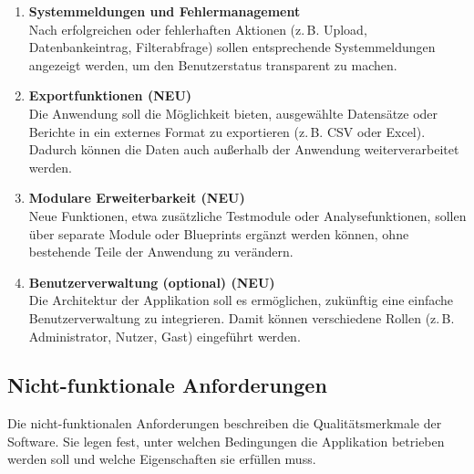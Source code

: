 \begin{enumerate}
  \item \textbf{Systemmeldungen und Fehlermanagement} \\
  Nach erfolgreichen oder fehlerhaften Aktionen (z.\,B. Upload, Datenbankeintrag, Filterabfrage) sollen entsprechende Systemmeldungen angezeigt werden, um den Benutzerstatus transparent zu machen.

  \item \textbf{Exportfunktionen \textbf{(NEU)}} \\
  Die Anwendung soll die Möglichkeit bieten, ausgewählte Datensätze oder Berichte in ein externes Format zu exportieren (z.\,B. CSV oder Excel).
  Dadurch können die Daten auch außerhalb der Anwendung weiterverarbeitet werden.

  \item \textbf{Modulare Erweiterbarkeit \textbf{(NEU)}} \\
  Neue Funktionen, etwa zusätzliche Testmodule oder Analysefunktionen, sollen über separate Module oder Blueprints ergänzt werden können, ohne bestehende Teile der Anwendung zu verändern.

  \item \textbf{Benutzerverwaltung (optional) \textbf{(NEU)}} \\
  Die Architektur der Applikation soll es ermöglichen, zukünftig eine einfache Benutzerverwaltung zu integrieren.
  Damit können verschiedene Rollen (z.\,B. Administrator, Nutzer, Gast) eingeführt werden.
\end{enumerate}

\subsection{Nicht-funktionale Anforderungen}
\label{subsec:nicht-funktionale-anforderungen}

Die nicht-funktionalen Anforderungen beschreiben die Qualitätsmerkmale der Software.
Sie legen fest, unter welchen Bedingungen die Applikation betrieben werden soll und welche Eigenschaften sie erfüllen muss.

